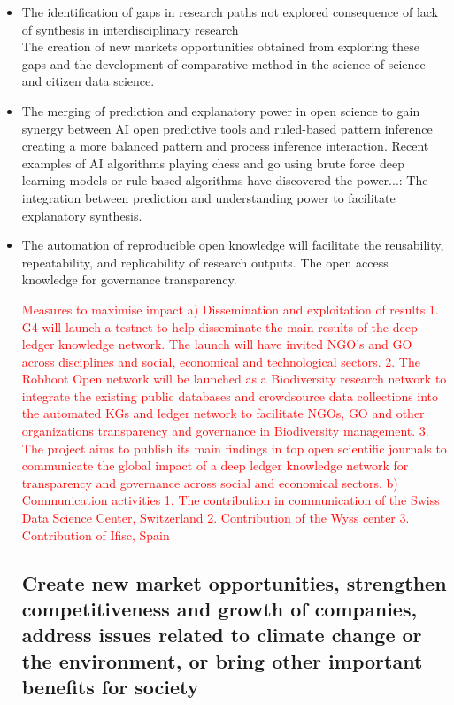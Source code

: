 \documentclass[12pt, a4paper]{article} %
\begin{document}
\begin{itemize}
\item The identification of gaps in research paths not explored
  consequence of lack of synthesis in interdisciplinary research\\
  The creation of new markets opportunities obtained from exploring
  these gaps and the development of comparative method in the science
  of science and citizen data science.

  \item The merging of prediction
  and explanatory power in open science to gain synergy between AI
  open predictive tools and ruled-based pattern inference creating a
  more balanced pattern and process inference interaction. Recent
  examples of AI algorithms playing chess and go using brute force
  deep learning models or rule-based algorithms have discovered the
  power...: The integration between prediction and understanding power
  to facilitate explanatory synthesis.

\item The automation of reproducible open knowledge will facilitate
  the reusability, repeatability, and replicability of research
  outputs. The open access knowledge for governance transparency.

  \textcolor{red}{Measures to maximise impact a) Dissemination and
    exploitation of results 1. G4 will launch a testnet to help
    disseminate the main results of the deep ledger knowledge
    network. The launch will have invited NGO’s and GO across
    disciplines and social, economical and technological sectors.
    2. The Robhoot Open network will be launched as a Biodiversity
    research network to integrate the existing public databases and
    crowdsource data collections into the automated KGs and ledger
    network to facilitate NGOs, GO and other organizations
    transparency and governance in Biodiversity management. 3. The
    project aims to publish its main findings in top open scientific
    journals to communicate the global impact of a deep ledger
    knowledge network for transparency and governance across social
    and economical sectors. b) Communication activities 1. The
    contribution in communication of the Swiss Data Science Center,
    Switzerland 2. Contribution of the Wyss center 3. Contribution of
    Ifisc, Spain}

  
\subsection{Create new market opportunities, strengthen
  competitiveness and growth of companies, address issues related to
  climate change or the environment, or bring other important benefits
  for society}


\end{itemize}
\end{document}
